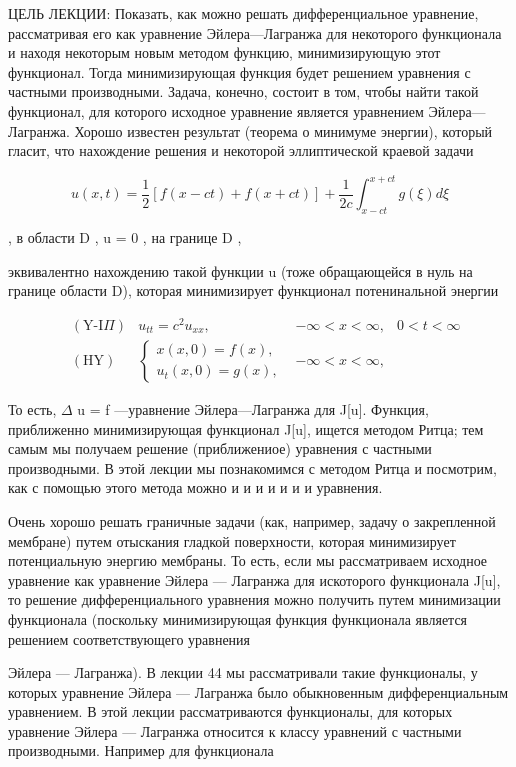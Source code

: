 \documentclass[
  ukrainian,
]{article}
\begin{document}
ЦЕЛЬ ЛЕКЦИИ: Показать, как можно решать дифференциальное уравнение,
рассматривая его как уравнение Эйлера---Лагранжа для некоторого
функционала и находя некоторым новым методом функцию, минимизирующую
этот функционал. Тогда минимизирующая функция будет решением уравнения с
частными производными. Задача, конечно, состоит в том, чтобы найти такой
функционал, для которого исходное уравнение является уравнением
Эйлера---Лагранжа. Хорошо известен результат (теорема о минимуме
энергии), который гласит, что нахождение решения и некоторой
эллиптической краевой задачи

\[
u(x, t) = \frac{1}{2} [f(x-ct) + f(x+ct)] + \frac{1}{2c} \int_{x-ct}^{x+ct} g(\xi) d\xi
\]

, в области D , u = 0 , на границе D ,

эквивалентно нахождению такой функции u (тоже обращающейся в нуль на
границе области D), которая минимизирует функционал потенинальной
энергии

\[
\begin{aligned} & (\text{Y-I}\Pi) & u_{tt} = c^2 u_{xx}, & -\infty < x < \infty, & 0 < t < \infty \\ & (\text{HY}) & \begin{cases} x(x, 0) = f(x), \\ u_t(x, 0) = g(x), \end{cases} & -\infty < x < \infty, \end{aligned}
\]

То есть, \(\Delta\) u = f ---уравнение Эйлера---Лагранжа для J{[}u{]}.
Функция, приближенно минимизирующая функционал J{[}u{]}, ищется методом
Ритца; тем самым мы получаем решение (приближениое) уравнения с частными
производными. В этой лекции мы познакомимся с методом Ритца и посмотрим,
как с помощью этого метода можно и и и и и и и уравнения.

Очень хорошо решать граничные задачи (как, например, задачу о
закрепленной мембране) путем отыскания гладкой поверхности, которая
минимизирует потенциальную энергию мембраны. То есть, если мы
рассматриваем исходное уравнение как уравнение Эйлера --- Лагранжа для
искоторого функционала J{[}u{]}, то решение дифференциального уравнения
можно получить путем минимизации функционала (поскольку минимизирующая
функция функционала является решением соответствующего уравнения

Эйлера --- Лагранжа). В лекции 44 мы рассматривали такие функционалы, у
которых уравнение Эйлера --- Лагранжа было обыкновенным дифференциальным
уравнением. В этой лекции рассматриваются функционалы, для которых
уравнение Эйлера --- Лагранжа относится к классу уравнений с частными
производными. Например для функционала
\end{document}
